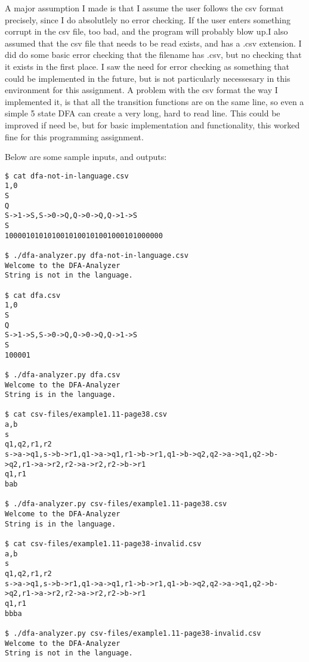 \documentclass{article}
\begin{document}
A major assumption I made is that I assume the user follows the csv format precisely, since I do absolutlely no error checking. If the user enters something corrupt in the csv file, too bad, and the program will probably blow up.I also assumed that the csv file that needs to be read exists, and has a .csv extension. I did do some basic error checking that the filename has .csv, but no checking that it exists in the first place. I saw the need for error checking as something that could be implemented in the future, but is not particularly necessesary in this environment for this assignment. A problem with the csv format the way I implemented it, is that all the transition functions are on the same line, so even a simple 5 state DFA can create a very long, hard to read line. This could be improved if need be, but for basic implementation and functionality, this worked fine for this programming assignment.


Below are some sample inputs, and outputs:

\begin{lstlisting}
$ cat dfa-not-in-language.csv 
1,0
S
Q
S->1->S,S->0->Q,Q->0->Q,Q->1->S
S
1000010101010010100101001000101000000

$ ./dfa-analyzer.py dfa-not-in-language.csv 
Welcome to the DFA-Analyzer
String is not in the language.

$ cat dfa.csv
1,0
S
Q
S->1->S,S->0->Q,Q->0->Q,Q->1->S
S
100001

$ ./dfa-analyzer.py dfa.csv
Welcome to the DFA-Analyzer
String is in the language.

$ cat csv-files/example1.11-page38.csv 
a,b
s
q1,q2,r1,r2
s->a->q1,s->b->r1,q1->a->q1,r1->b->r1,q1->b->q2,q2->a->q1,q2->b->q2,r1->a->r2,r2->a->r2,r2->b->r1
q1,r1
bab

$ ./dfa-analyzer.py csv-files/example1.11-page38.csv 
Welcome to the DFA-Analyzer
String is in the language.

$ cat csv-files/example1.11-page38-invalid.csv 
a,b
s
q1,q2,r1,r2
s->a->q1,s->b->r1,q1->a->q1,r1->b->r1,q1->b->q2,q2->a->q1,q2->b->q2,r1->a->r2,r2->a->r2,r2->b->r1
q1,r1
bbba

$ ./dfa-analyzer.py csv-files/example1.11-page38-invalid.csv 
Welcome to the DFA-Analyzer
String is not in the language.
\end{lstlisting}
\end{document}
